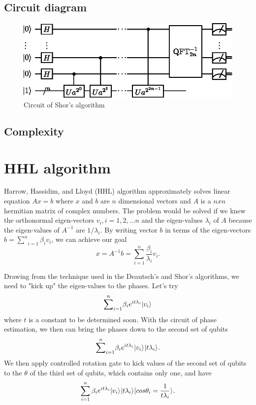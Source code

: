 \documentclass[oneside, letter, 12pt]{book}
\begin{document}
\subsection{Circuit diagram}
\begin{figure}[h]
\includegraphics[width=12cm]{pic/Shor_algorithm.eps}
\caption{Circuit of Shor's algorithm}
\label{ShorAlgorithm}
\end{figure}

\subsection{Complexity}

\section{HHL algorithm}
Harrow, Hassidim, and Lloyd (HHL) algorithm approximately solves linear equation $A x = b$ where $x$ and $b$ are $n$ dimensional vectors and $A$ is a $n x n$ hermitian matrix of complex numbers. The problem would be solved if we knew the orthonormal eigen-vectors ${v_i}, i=1, 2, ...n$ and the eigen-values ${\lambda_i}$ of $A$ because the eigen-values of $A^{-1}$ are  ${1/\lambda_i}$. By writing vector $b$ in terms of the eigen-vectors $b = {\sum^n}_{i=1} \beta_i v_i$, we can achieve our goal
\begin{equation}
    x = A^{-1} b = \sum^{n}_{i=1} \frac {\beta_i} {\lambda_i} v_i .
\end{equation}

Drawing from the technique used in the Deautsch's and Shor's algorithms, we need to "kick up" the eigen-values to the phases. Let's try
\begin{equation}\label{hhl-1}
    {\sum^n}_{i=1} \beta_i e^{i t \lambda_i} \vert {v_i} \rangle_{}
\end{equation}
where $t$ is a constant to be determined soon. With the circuit of phase estimation, we then can bring the phases down to the second set of qubits
\begin{equation}\label{hhl-2}
    {\sum^n}_{i=1} \beta_i e^{i t \lambda_i} \vert {v_i} \rangle_{} \vert {t\lambda_i} \rangle_{}.
\end{equation}
We then apply controlled rotation gate to kick values of the second set of qubits to the $\theta$ of the third set of qubits, which contains only one, and have
\begin{equation}\label{hhl-3}
    \sum_{i=1}^n \beta_i e^{i t \lambda_i} \vert {v_i} \rangle_{} \vert {t\lambda_i} \rangle_{} \vert {cos\theta_i=\frac 1 {t\lambda_i}} \rangle_{}.
\end{equation}
\end{document}
